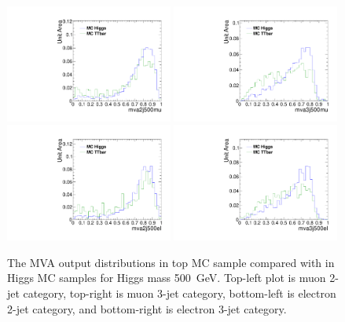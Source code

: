 \begin{figure}[!t]
  \centering
  \includegraphics[width=0.49\textwidth]{figs/cl-mva2j500mu-mvaTopvsHiggs.pdf}
  \includegraphics[width=0.49\textwidth]{figs/cl-mva3j500mu-mvaTopvsHiggs.pdf}
  \includegraphics[width=0.49\textwidth]{figs/cl-mva2j500el-mvaTopvsHiggs.pdf}
  \includegraphics[width=0.49\textwidth]{figs/cl-mva3j500el-mvaTopvsHiggs.pdf}
  \caption{\label{fig:mva:sigvsttbar-mva2j500}The MVA output
    distributions in top MC sample compared with in Higgs MC
    samples for Higgs mass 500~GeV. Top-left plot is muon 2-jet category,
    top-right is muon 3-jet category, bottom-left is electron 2-jet
    category, and bottom-right is electron 3-jet category. }
\end{figure}

